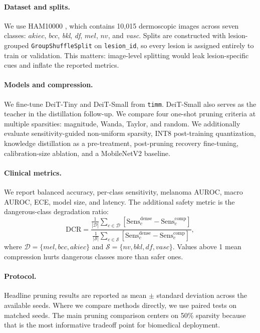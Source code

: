 \documentclass{article}
\newcommand{\mel}{\ensuremath{\textit{mel}}}
\newcommand{\bcc}{\ensuremath{\textit{bcc}}}
\newcommand{\akiec}{\ensuremath{\textit{akiec}}}
\newcommand{\nv}{\ensuremath{\textit{nv}}}
\newcommand{\DCR}{\ensuremath{\mathrm{DCR}}}
\begin{document}
\paragraph{Dataset and splits.}
We use HAM10000 \cite{tschandl2018ham10000}, which contains 10{,}015 dermoscopic images across seven classes: \akiec{}, \bcc{}, \textit{bkl}, \textit{df}, \mel{}, \nv{}, and \textit{vasc}. Splits are constructed with lesion-grouped \texttt{GroupShuffleSplit} on \texttt{lesion\_id}, so every lesion is assigned entirely to train or validation. This matters: image-level splitting would leak lesion-specific cues and inflate the reported metrics.

\paragraph{Models and compression.}
We fine-tune DeiT-Tiny and DeiT-Small from \texttt{timm}. DeiT-Small also serves as the teacher in the distillation follow-up. We compare four one-shot pruning criteria at multiple sparsities: magnitude, Wanda, Taylor, and random. We additionally evaluate sensitivity-guided non-uniform sparsity, INT8 post-training quantization, knowledge distillation as a pre-treatment, post-pruning recovery fine-tuning, calibration-size ablation, and a MobileNetV2 baseline.

\paragraph{Clinical metrics.}
We report balanced accuracy, per-class sensitivity, melanoma AUROC, macro AUROC, ECE, model size, and latency. The additional safety metric is the dangerous-class degradation ratio:
\begin{equation}
\DCR = \frac{\frac{1}{|\mathcal{D}|}\sum_{c \in \mathcal{D}}\left[\mathrm{Sens}^{\text{dense}}_c - \mathrm{Sens}^{\text{comp}}_c\right]}{\frac{1}{|\mathcal{S}|}\sum_{c \in \mathcal{S}}\left[\mathrm{Sens}^{\text{dense}}_c - \mathrm{Sens}^{\text{comp}}_c\right]},
\end{equation}
where $\mathcal{D}=\{\mel,\bcc,\akiec\}$ and $\mathcal{S}=\{\nv,\textit{bkl},\textit{df},\textit{vasc}\}$. Values above 1 mean compression hurts dangerous classes more than safer ones.

\paragraph{Protocol.}
Headline pruning results are reported as mean $\pm$ standard deviation across the available seeds. Where we compare methods directly, we use paired tests on matched seeds. The main pruning comparison centers on 50\% sparsity because that is the most informative tradeoff point for biomedical deployment.
\end{document}
